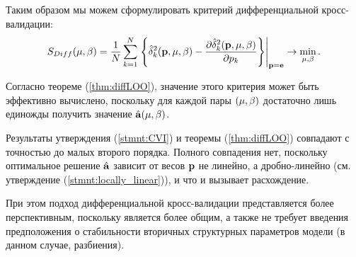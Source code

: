 Таким образом мы можем сформулировать критерий дифференциальной кросс-валидации:
\begin{equation*}
	S_{Diff}({\mu,\beta}) 
	= \frac1N\sum\limits_{k=1}^N \left. \left\{
		\hat{\delta}_k^2(\boldsymbol{\mathbf{p}}, {\mu,\beta})
		- \frac{\partial\hat{\delta}_k^2(\boldsymbol{\mathbf{p}}, {\mu,\beta})}{\partial p_k} 
	\right\}\right|_{\boldsymbol{\mathbf{p}}=\boldsymbol{\mathbf{e}}} \to \mathop{\mbox{min}}\limits_{{\mu,\beta}}.
\end{equation*}

Согласно теореме (\ref{thm:diffLOO}), значение этого критерия может быть эффективно вычислено, поскольку для каждой пары $({\mu,\beta})$ достаточно лишь единожды получить значение $\hat{\boldsymbol{\mathbf{a}}}({\mu,\beta})$.

Результаты утверждения (\ref{stmnt:CVI}) и теоремы (\ref{thm:diffLOO}) совпадают с точностью до малых второго порядка. 
Полного совпадения нет, поскольку оптимальное решение $\hat{\boldsymbol{\mathbf{a}}}$ зависит от весов $\boldsymbol{\mathbf{p}}$ не линейно, 
а дробно-линейно (см. утверждение (\ref{stmnt:locally_linear})), и что и вызывает расхождение.

При этом подход дифференциальной кросс-валидации представляется более перспективным, поскольку является более общим, 
а также не требует введения предположения о стабильности вторичных структурных параметров модели (в данном случае, разбиения).
